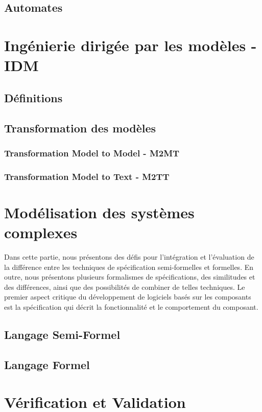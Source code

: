 \documentclass[french]{spimufcphdthesis}
\begin{document}
\subsection{Automates}





\section{Ingénierie dirigée par les modèles - IDM}
\subsection{Définitions}
\subsection{Transformation des modèles}
\subsubsection{Transformation Model to Model - M2MT}
\subsubsection{Transformation Model to Text  - M2TT}

\section{Modélisation des systèmes complexes}
Dans cette partie, nous présentons des défis pour l'intégration et l'évaluation de la différence entre les techniques de spécification semi-formelles et formelles. En outre, nous présentons plusieurs formalismes de spécifications, des similitudes et des différences, ainsi que des possibilités de combiner de telles techniques. Le premier aspect critique du développement de logiciels basés sur les composants est la spécification qui décrit la fonctionnalité et le comportement du composant.
\subsection{Langage Semi-Formel}
\subsection{Langage Formel}

\section{Vérification et Validation}
\end{document}
